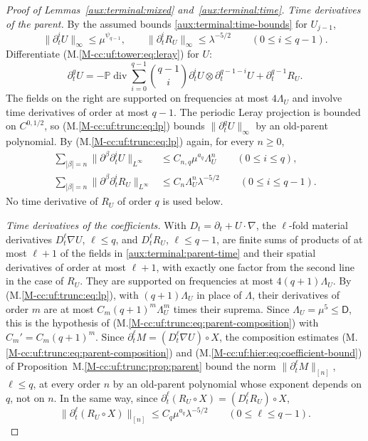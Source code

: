 \documentclass[11pt]{amsart}
\numberwithin{equation}{section}
\newcommand{\Holder}[1]{C^{#1,1/2}}
\newcommand{\diver}{\operatorname{div}}
\newcommand{\PP}{\mathbb P}
\begin{document}
\begin{proof}[Proof of Lemmas~\ref{aux:terminal:mixed} and~\ref{aux:terminal:time}]
\emph{Time derivatives of the parent.}
By the assumed bounds \eqref{aux:terminal:time-bounds} for $U_{j-1}$,
\[
 \|\partial_t^iU\|_\infty\le\mu^{\psi_{q-1}},\qquad
 \|\partial_t^iR_U\|_\infty\le\lambda^{-5/2}
 \qquad(0\le i\le q-1).
\]
Differentiate \textup{(M.\ref{M-cc:uf:tower:eq:leray})} for $U$:
\[
 \partial_t^qU
 =-\PP\diver\sum_{i=0}^{q-1}\binom{q-1}i
                 \partial_t^iU\otimes\partial_t^{q-1-i}U
  +\partial_t^{q-1}R_U .
\]
The fields on the right are supported on frequencies at most $4\Lambda_U$ and involve time
derivatives of order at most $q-1$. The periodic Leray projection
is bounded on $\Holder{0}$, so
\textup{(M.\ref{M-cc:uf:trunc:eq:lp})} bounds
$\|\partial_t^qU\|_\infty$ by an old-parent polynomial. By
\textup{(M.\ref{M-cc:uf:trunc:eq:lp})} again, for every $n\ge0$,
\begin{equation}\label{aux:terminal:parent-time}
 \begin{aligned}
 \sum_{|\beta|=n}\|\partial^\beta\partial_t^iU\|_{L^\infty}
   &\le C_{n,q}\mu^{a_q}\Lambda_U^n\qquad(0\le i\le q),\\
 \sum_{|\beta|=n}\|\partial^\beta\partial_t^iR_U\|_{L^\infty}
   &\le C_n\Lambda_U^n\lambda^{-5/2}\qquad(0\le i\le q-1).
 \end{aligned}
\end{equation}
No time derivative of $R_U$ of order $q$ is used below.

\emph{Time derivatives of the coefficients.}
With $D_t=\partial_t+U\cdot\nabla$, the
$\ell$-fold material derivatives $D_t^\ell\nabla U$, $\ell\le q$, and
$D_t^\ell R_U$, $\ell\le q-1$, are
finite sums of products of at most $\ell+1$ of the fields in
\eqref{aux:terminal:parent-time} and their spatial derivatives of order
at most $\ell+1$, with exactly one factor from the second line in the
case of $R_U$. They are supported on frequencies at most $4(q+1)\Lambda_U$.
By \textup{(M.\ref{M-cc:uf:trunc:eq:lp})}, with $(q+1)\Lambda_U$ in
place of $\Lambda$, their derivatives of order $m$
are at most $C_m(q+1)^m\Lambda_U^m$ times their suprema. Since
$\Lambda_U=\mu^5\le\mathsf D$, this is the hypothesis of
\textup{(M.\ref{M-cc:uf:trunc:eq:parent-composition})} with
$C_m'=C_m(q+1)^m$.
Since $\partial_t^\ell M=(D_t^\ell\nabla U)\circ X$, the composition
estimates \textup{(M.\ref{M-cc:uf:trunc:eq:parent-composition})} and
\textup{(M.\ref{M-cc:uf:hier:eq:coefficient-bound})} of
Proposition~M.\ref{M-cc:uf:trunc:prop:parent} bound the norm
$\|\partial_t^\ell M\|_{[n]}$, $\ell\le q$, at every order $n$ by an
old-parent polynomial whose exponent depends on $q$, not on $n$. In the
same way, since
$\partial_t^\ell(R_U\circ X)=(D_t^\ell R_U)\circ X$,
\begin{equation}\label{aux:terminal:residual-jets}
 \|\partial_t^\ell(R_U\circ X)\|_{[n]}\le C_q\mu^{a_q}\lambda^{-5/2}
 \qquad(0\le\ell\le q-1).
\end{equation}


\end{proof}
\end{document}
